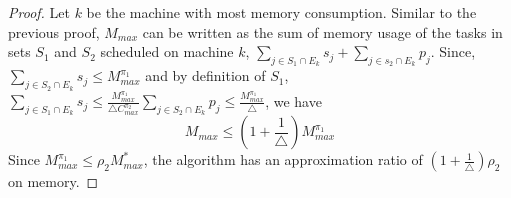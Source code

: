    \begin{proof}
   Let $k $ be the machine with most memory consumption.  Similar to the previous proof, $M_{max}$ can be written as the sum of memory usage of the tasks in sets $S_1$ and $S_2$ scheduled on machine $k$, $\sum\limits
   _{j \in S_1 \cap E_k}^{}s_j+\sum\limits_{j \in s_2 \cap E_k}^{}p_j $. Since,  $\sum\limits
      _{j \in S_2 \cap E_k}^{}s_j\leq {M}^{\pi_1}_{max}$ and by definition of $ S_1$, $\sum\limits
            _{j \in S_1 \cap E_k}^{}s_j\leq \frac{{M}^{\pi_1}_{max}}{\triangle C^{\pi_2}_{max}}\sum\limits _{j \in S_2\cap E_k} p_j \leq  \frac{{M}^{\pi_1}_{max}}{\triangle }$, we have
           \begin{equation}\nonumber                     M_{max}\leq(1+\frac{1}{\triangle}){M}^{\pi_1}_{max}                         \end{equation}
       Since ${M}^{\pi_1}_{max} \leq \rho_2 {M}^{*}_{max}$, the algorithm has an approximation ratio of $ (1+\frac{1}{\triangle})  \rho_2$ on memory.
                               \end{proof}
                           
                           
  
 